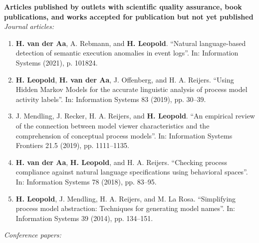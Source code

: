 
\noindent \textbf{Articles published by outlets with scientific quality assurance, book publications, and works accepted for publication but not yet published}\\[6pt]
\textit{Journal articles:}
\begingroup
\fontsize{10pt}{1}\selectfont
\begin{enumerate}[leftmargin=*]
	\item \textbf{H. van der Aa}, A. Rebmann, and \textbf{H. Leopold}. “Natural language-based detection of semantic execution anomalies in event logs”. In: Information Systems (2021), p. 101824.

	\item \textbf{H. Leopold}, \textbf{H. van der Aa}, J. Offenberg, and H. A. Reijers. “Using Hidden Markov Models for the accurate linguistic analysis of process model activity labels”. In: Information Systems 83 (2019), pp. 30–39.

	\item J. Mendling, J. Recker, H. A. Reijers, and \textbf{H. Leopold}. “An empirical review of the connection between model viewer characteristics and the comprehension of conceptual process models”. In: Information Systems Frontiers 21.5 (2019), pp. 1111–1135.

	\item \textbf{H. van der Aa}, \textbf{H. Leopold}, and H. A. Reijers. “Checking process compliance against natural language specifications using behavioral spaces”. In: Information Systems 78 (2018), pp. 83–95.


	\item \textbf{H. Leopold}, J. Mendling, H. A. Reijers, and M. La Rosa. “Simplifying process model abstraction: Techniques for generating model names”. In: Information Systems 39 (2014), pp. 134–151.


\end{enumerate}
\endgroup
\textit{Conference papers:}
\begingroup
\fontsize{10pt}{1}\selectfont
